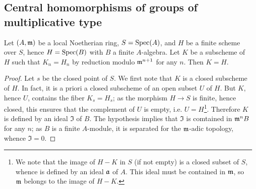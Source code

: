 \subsection{Central homomorphisms of groups of multiplicative type}
\begin{lemma}\label{scheme local Noe subscheme equal if closed point reduction}
Let $(A,\mathfrak{m})$ be a local Noetherian ring, $S=\mathrm{Spec}(A)$, and $H$ be a finite scheme over $S$, hence $H=\mathrm{Spec}(B)$ with $B$ a finite $A$-algebra. Let $K$ be a subscheme of $H$ such that $K_n=H_n$ by reduction modulo $\mathfrak{m}^{n+1}$ for any $n$. Then $K=H$.
\end{lemma}
\begin{proof}
Let $s$ be the closed point of $S$. We first note that $K$ is a closed subscheme of $H$. In fact, it is a priori a closed subscheme of an open subset $U$ of $H$. But $K$, hence $U$, contains the fiber $K_s=H_s$; as the morphism $H\to S$ is finite, hence closed, this ensures that the complement of $U$ is empty, i.e. $U=H$\footnote{We note that the image of $H-K$ in $S$ (if not empty) is a closed subset of $S$, whence is defined by an ideal $\mathfrak{a}$ of $A$. This ideal must be contained in $\mathfrak{m}$, so $\mathfrak{m}$ belongs to the image of $H-K$.}. Therefore $K$ is defined by an ideal $\mathfrak{I}$ of $B$. The hypothesis implies that $\mathfrak{I}$ is comtained in $\mathfrak{m}^nB$ for any $n$; as $B$ is a finite $A$-module, it is separated for the $\mathfrak{m}$-adic topology, whence $\mathfrak{I}=0$.
\end{proof}

